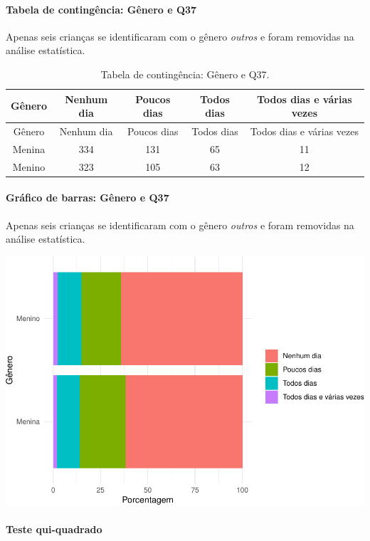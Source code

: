 \documentclass[]{article}
\let\oldparagraph\paragraph
\renewcommand{\paragraph}[1]{\oldparagraph{#1}\mbox{}}
\begin{document}
\cleardoublepage

\hypertarget{tabela-de-continguxeancia-guxeanero-e-q37}{%
\paragraph{Tabela de contingência: Gênero e Q37}\label{tabela-de-continguxeancia-guxeanero-e-q37}}

Apenas seis crianças se identificaram com o gênero \emph{outros} e foram removidas na análise estatística.

\begin{longtable}[]{@{}ccccc@{}}
\caption{\label{tab:unnamed-chunk-1379}Tabela de contingência: Gênero e Q37.}\tabularnewline
\toprule
Gênero & Nenhum dia & Poucos dias & Todos dias & Todos dias e várias vezes\tabularnewline
\midrule
\endfirsthead
\toprule
Gênero & Nenhum dia & Poucos dias & Todos dias & Todos dias e várias vezes\tabularnewline
\midrule
\endhead
Menina & 334 & 131 & 65 & 11\tabularnewline
Menino & 323 & 105 & 63 & 12\tabularnewline
\bottomrule
\end{longtable}

\hypertarget{gruxe1fico-de-barras-guxeanero-e-q37}{%
\paragraph{Gráfico de barras: Gênero e Q37}\label{gruxe1fico-de-barras-guxeanero-e-q37}}

Apenas seis crianças se identificaram com o gênero \emph{outros} e foram removidas na análise estatística.

\begin{center}\includegraphics[width=0.75\linewidth]{relatorio_covid19_files/figure-latex/unnamed-chunk-1380-1} \end{center}

\hypertarget{teste-qui-quadrado-118}{%
\paragraph{Teste qui-quadrado}\label{teste-qui-quadrado-118}}
\end{document}
